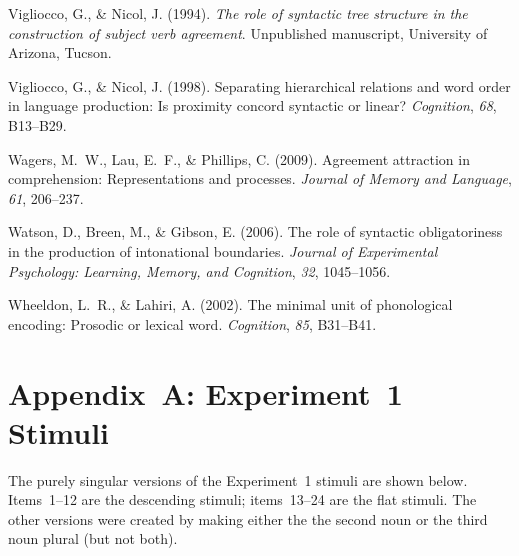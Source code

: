 \documentclass[12pt,titlepage]{article}
\newcommand{\itt}{\textit}  %
\begin{document}
\begin{description}
    \item Vigliocco, G., \& Nicol, J\@.  (1994).  \itt{The role of
    syntactic tree structure in the construction of subject verb
    agreement}.  Unpublished manuscript, University of Arizona, Tucson.

    \item Vigliocco, G., \& Nicol, J\@.  (1998).  Separating hierarchical
    relations and word order in language production: Is proximity concord
    syntactic or linear?  \itt{Cognition}, \itt{68}, B13--B29.
    
    \item Wagers, M.~W., Lau, E.~F., \& Phillips, C\@.  (2009).  Agreement
    attraction in comprehension: Representations and processes.
    \itt{Journal of Memory and Language}, \itt{61}, 206--237.
    
    \item Watson, D., Breen, M., \& Gibson, E\@.  (2006).  The role of
    syntactic obligatoriness in the production of intonational boundaries.
    \itt{Journal of Experimental Psychology: Learning, Memory, and
    Cognition}, \itt{32}, 1045--1056.
    
    \item Wheeldon, L.~R., \& Lahiri, A\@.  (2002).  The minimal unit of
    phonological encoding: Prosodic or lexical word.  \itt{Cognition},
    \itt{85}, B31--B41.
    
    
\end{description}

\clearpage

\section[Appendix~A]{\center Appendix~A: Experiment~1 Stimuli}

The purely singular versions of the Experiment~1 stimuli are shown
below.  Items~1--12 are the descending stimuli; items~13--24 are the
flat stimuli.  The other versions were created by making either the
the second noun or the third noun plural (but not both).
\end{document}
